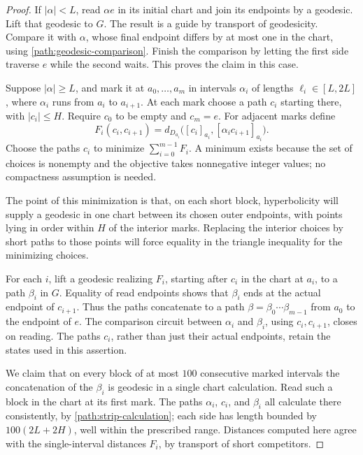 \begin{proof}
If $|\alpha|<L$, read $\alpha e$ in its initial chart and join its
endpoints by a geodesic.  Lift that geodesic to $G$.  The result is a
guide by transport of geodesicity.  Compare it with $\alpha$, whose
final endpoint differs by at most one in the chart, using
\eqref{path:geodesic-comparison}.  Finish the comparison by letting the
first side traverse $e$ while the second waits.  This proves the claim
in this case.

Suppose $|\alpha|\ge L$, and mark it at
$a_0,\ldots,a_m$ in intervals $\alpha_i$ of lengths
$\ell_i\in[L,2L]$, where $\alpha_i$ runs from $a_i$ to $a_{i+1}$.
At each mark choose a path $c_i$ starting there, with $|c_i|\le H$.
Require $c_0$ to be empty and $c_m=e$.  For adjacent marks define
\[
 F_i(c_i,c_{i+1})=
 d_{D_{a_i}}\bigl([c_i]_{a_i},[\alpha_i c_{i+1}]_{a_i}\bigr).
\]
Choose the paths $c_i$ to minimize $\sum_{i=0}^{m-1}F_i$.  A minimum
exists because the set of choices is nonempty and the objective takes
nonnegative integer values; no compactness assumption is needed.

The point of this minimization is that, on each short block,
hyperbolicity will supply a geodesic in one chart between its chosen
outer endpoints, with points lying in order within $H$ of the interior
marks.  Replacing the interior choices by short paths to those points
will force equality in the triangle inequality for the minimizing
choices.

For each $i$, lift a geodesic realizing $F_i$, starting after $c_i$ in
the chart at $a_i$, to a path $\beta_i$ in $G$.  Equality of read
endpoints shows that $\beta_i$ ends at the actual endpoint of $c_{i+1}$.
Thus the paths concatenate to a path
$\beta=\beta_0\cdots\beta_{m-1}$ from $a_0$ to the endpoint of $e$.
The comparison circuit between $\alpha_i$ and $\beta_i$, using
$c_i,c_{i+1}$, closes on reading.  The paths $c_i$, rather than just
their actual endpoints, retain the states used in this assertion.

We claim that on every block of at most $100$ consecutive marked
intervals the concatenation of the $\beta_i$ is geodesic in a single
chart calculation.  Read such a block in the chart at its first mark.
The paths $\alpha_i$, $c_i$, and $\beta_i$ all calculate there
consistently, by \eqref{path:strip-calculation}; each side has length
bounded by $100(2L+2H)$, well within the prescribed range.  Distances
computed here agree with the single-interval distances $F_i$, by
transport of short competitors.


\end{proof}

